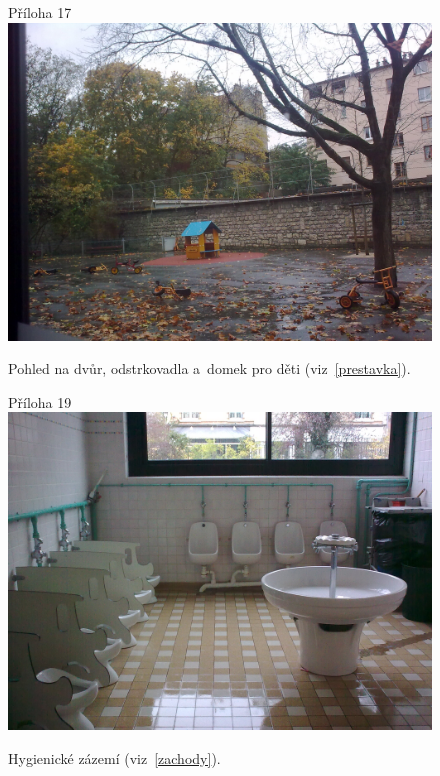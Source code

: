 	\begin{figure}[tb]
		\centering
		Příloha 17\\
		\includegraphics[height=0.35\textheight]{./fotky/Obr17.jpg}
		\caption{
			Pohled na dvůr, odstrkovadla a~domek pro děti (viz~\ref{prestavka}).
		}
		\label{Obr17}
	\end{figure}
	
	\begin{figure}[tb]
		\centering
		Příloha 19\\
		\includegraphics[height=0.35\textheight]{./fotky/Obr19.jpg}
		\caption{
			Hygienické zázemí (viz~\ref{zachody}).
		}
		\label{Obr18}
	\end{figure}


